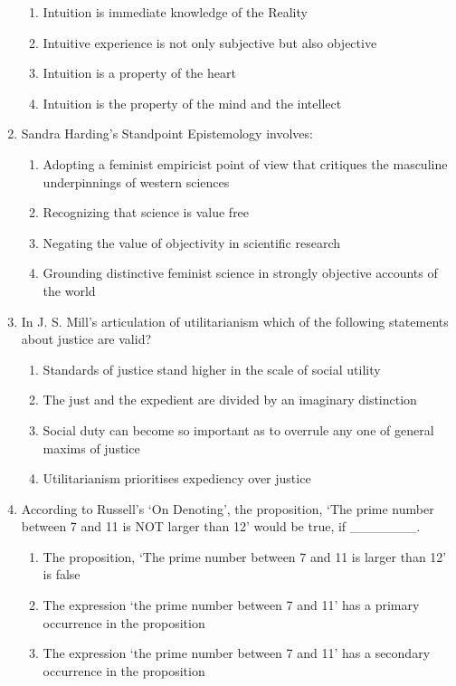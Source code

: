 \documentclass[12pt]{article}
\theoremstyle{remark}
\begin{document}
\begin{enumerate}
\begin{enumerate}
    \item Intuition is immediate knowledge of the Reality 
    \item Intuitive experience is not only subjective but also objective
    \item Intuition is a property of the heart
    \item Intuition is the property of the mind and the intellect
\end{enumerate}
\hfill{}
\item Sandra Harding’s Standpoint Epistemology involves:
\begin{enumerate}
    \item Adopting a feminist empiricist point of view that critiques the masculine underpinnings of western sciences 
    \item Recognizing that science is value free
    \item Negating the value of objectivity in scientific research
    \item Grounding distinctive feminist science in strongly objective accounts of the world
\end{enumerate}
\hfill{}
\item In J. S. Mill’s articulation of utilitarianism which of the following statements about justice are valid?
\begin{enumerate}
    \item Standards of justice stand higher in the scale of social utility
    \item The just and the expedient are divided by an imaginary distinction
    \item Social duty can become so important as to overrule any one of general maxims of justice
    \item Utilitarianism prioritises expediency over justice
\end{enumerate}
\hfill{}
\item According to Russell’s ‘On Denoting’, the proposition, ‘The prime number between 7 and 11 is NOT larger than 12’ would be true, if \_\_\_\_\_\_\_.
\begin{enumerate}
    \item The proposition, ‘The prime number between 7 and 11 is larger than 12’ is false
    \item The expression ‘the prime number between 7 and 11’ has a primary occurrence in the proposition
    \item The expression ‘the prime number between 7 and 11’ has a secondary occurrence in the proposition

\end{enumerate}
\end{enumerate}
\end{document}
